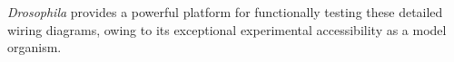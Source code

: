 \textit{Drosophila} provides a powerful platform for functionally testing these detailed wiring diagrams, owing to its exceptional experimental accessibility as a model organism.




